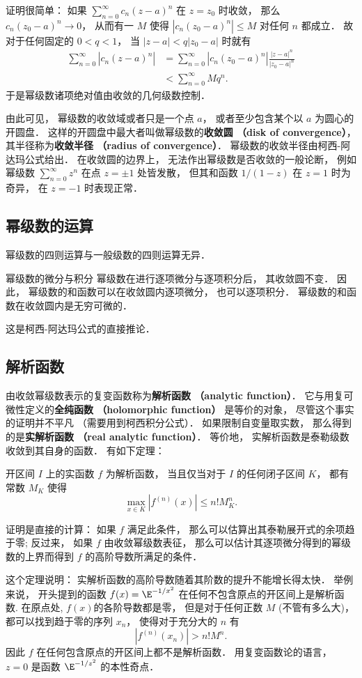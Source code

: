 证明很简单： 如果 $\sum_{n=0}^\infty c_n(z-a)^n$ 在 $z=z_0$ 时收敛， 那么 $c_n(z_0-a)^n\to0$， 从而有一 $M$ 使得 $|c_n(z_0-a)^n|\leq M$ 对任何 $n$ 都成立． 故对于任何固定的 $0<q<1$， 当 $|z-a|<q|z_0-a|$ 时就有
$$
\begin{aligned}
\sum_{n=0}^\infty |c_n(z-a)^n|
&=\sum_{n=0}^\infty |c_n(z_0-a)^n|\frac{|z-a|^n}{|z_0-a|^n}\\
&<\sum_{n=0}^\infty Mq^n.
\end{aligned}
$$
于是幂级数诸项绝对值由收敛的几何级数控制．

由此可见， 幂级数的收敛域或者只是一个点 $a$， 或者至少包含某个以 $a$ 为圆心的开圆盘． 这样的开圆盘中最大者叫做幂级数的\textbf{收敛圆 （disk of convergence）}， 其半径称为\textbf{收敛半径 （radius of convergence）}． 幂级数的收敛半径由柯西-阿达玛公式给出． 在收敛圆的边界上， 无法作出幂级数是否收敛的一般论断， 例如幂级数 $\sum_{n=0}^\infty z^n$ 在点 $z=\pm1$ 处皆发散， 但其和函数 $1/(1-z)$ 在 $z=1$ 时为奇异， 在 $z=-1$ 时表现正常．

\subsection{幂级数的运算}
幂级数的四则运算与一般级数的四则运算无异．

\begin{theorem}{幂级数的微分与积分}
幂级数在进行逐项微分与逐项积分后， 其收敛圆不变． 因此， 幂级数的和函数可以在收敛圆内逐项微分， 也可以逐项积分． 幂级数的和函数在收敛圆内是无穷可微的．
\end{theorem}
这是柯西-阿达玛公式的直接推论． 

\subsection{解析函数}
由收敛幂级数表示的复变函数称为\textbf{解析函数 （analytic function）}． 它与用复可微性定义的\textbf{全纯函数 （holomorphic function）} 是等价的对象， 尽管这个事实的证明并不平凡 （需要用到柯西积分公式）． 如果限制自变量取实数， 那么得到的是\textbf{实解析函数 （real analytic function）}． 等价地， 实解析函数是泰勒级数收敛到其自身的函数． 有如下定理：

\begin{theorem}{}
开区间 $I$ 上的实函数 $f$ 为解析函数， 当且仅当对于 $I$ 的任何闭子区间 $K$， 都有常数 $M_K$ 使得
$$
\max_{x\in K}|f^{(n)}(x)|\leq n!M_K^n.
$$
\end{theorem}

证明是直接的计算： 如果 $f$ 满足此条件， 那么可以估算出其泰勒展开式的余项趋于零; 反过来， 如果 $f$ 由收敛幂级数表征， 那么可以估计其逐项微分得到的幂级数的上界而得到 $f$ 的高阶导数所满足的条件．

这个定理说明： 实解析函数的高阶导数随着其阶数的提升不能增长得太快． 举例来说， 开头提到的函数 $f(x)=\E^{-1/x^2}$ 在任何不包含原点的开区间上是解析函数. 在原点处, $f(x)$的各阶导数都是零， 但是对于任何正数 $M$ (不管有多么大)， 都可以找到趋于零的序列 $x_n$， 使得对于充分大的 $n$ 有
$$
|f^{(n)}(x_n)|>n!M^n.
$$
因此 $f$ 在任何包含原点的开区间上都不是解析函数． 用复变函数论的语言， $z=0$ 是函数 $\E^{-1/z^2}$ 的本性奇点．


